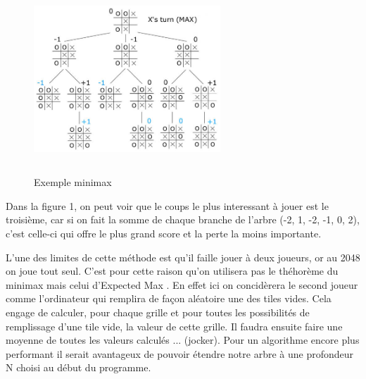 \documentclass{article}
\begin{document}
\begin{figure}[!h]
   \includegraphics[width=7cm,height=7cm]{minimax.jpg}
   \caption{\label{minimax} Exemple minimax}
\end{figure}

Dans la figure 1, on peut voir que le coups le plus interessant à jouer est le troisi\`eme, car si on fait la somme de chaque branche de l'arbre (-2, 1, -2, -1, 0, 2), c'est celle-ci qui offre le plus grand score et la perte la moins importante.

L'une des limites de cette m\'ethode est qu'il faille jouer \`a deux joueurs, or au 2048 on joue tout seul. C'est pour cette raison qu'on utilisera pas le th\'ehor\`eme du \og minimax \fg{} mais celui d'\og Expected Max \fg{}. En effet ici on concid\`erera le second joueur comme l'ordinateur qui remplira de façon aléatoire une des tiles vides. Cela engage de calculer, pour chaque grille et pour toutes les possibilit\'es de remplissage d'une tile vide, la valeur de cette grille. Il faudra ensuite faire une moyenne de toutes les valeurs calculés ... (jocker). Pour un algorithme encore plus performant il serait avantageux de pouvoir \'etendre notre arbre \`a une profondeur N choisi au d\'ebut du programme. 
\end{document}
